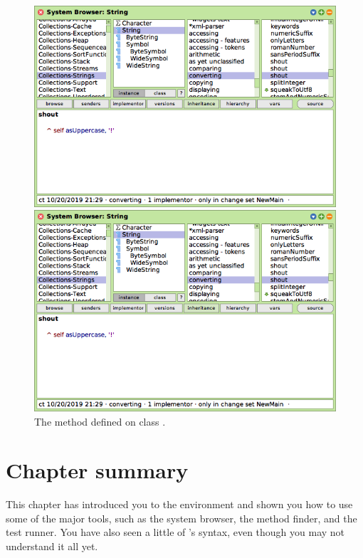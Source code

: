 \documentclass[a4paper,10pt,twoside]{book}
\begin{document}
\begin{figure}[hbt]
\ifluluelse
	{\centerline{\includegraphics[width=\textwidth]{String-Shout}}}
	{\centerline{\includegraphics[scale=0.7]{String-Shout}}}
\caption{The  method defined on class .
\label{fig:String-shout}}
\end{figure}

\section{Chapter summary}
This chapter has introduced you to the \sq environment and shown you how to use some of the major tools, such as the system browser, the method finder, and the test runner.   You have also seen a little of \sq's syntax, even though you may not understand it all yet.
\end{document}

